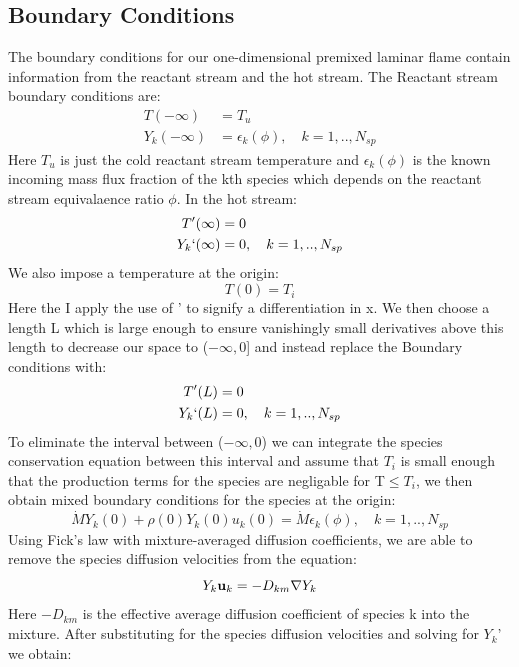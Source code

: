 \documentclass{article}
\begin{document}
\subsection{Boundary Conditions}
The boundary conditions for our one-dimensional premixed laminar flame contain information from the reactant stream and the hot stream. The Reactant stream boundary conditions are:
\begin{align}
  T(-\infty) &= T_{u} \\
  Y_{k}(-\infty) &= \epsilon_{k}({\phi}), \quad k=1,..,N_{sp}
  \end{align}
Here $T_{u}$ is just the cold reactant stream temperature and $\epsilon_{k}(\phi)$ is the known incoming mass flux fraction of the kth species which depends on the reactant stream equivalaence ratio $\phi$. In the hot stream:
\begin{align}
  T'(\infty) & = 0\\
  Y_{k}`(\infty) &= 0,\quad k=1,..,N_{sp}
\end{align}
We also impose a temperature at the origin:
\begin{equation}
  T(0) = T_{i}
\end{equation}
Here the I apply the use of ' to signify a differentiation in x. We then choose a length L which is large enough to ensure vanishingly small derivatives above this length to decrease our space to ($-\infty,0$] and instead replace the Boundary conditions with:
\begin{align}
  T'(L) & = 0\\
  Y_{k}`(L) &= 0, \quad k=1,..,N_{sp}
\end{align}
To eliminate the interval between ($-\infty,0$) we can integrate the species conservation equation between this interval and assume that $T_{i}$ is small enough that the production terms for the species are negligable for T$\leq T_{i}$, we then obtain mixed boundary conditions for the species at the origin:
  \begin{equation}
\dot{M}Y_{k}(0) +\rho(0)Y_{k}(0)u_{k}(0) = \dot{M}\epsilon_{k}(\phi), \quad k=1,..,N_{sp}
  \end{equation}
  Using Fick's law with mixture-averaged diffusion coefficients, we are able to remove the species diffusion velocities from the equation:
  \begin{equation}
    Y_{k}\textbf{u}_{k} = -D_{km}\nabla Y_{k}\\
  \end{equation}
  Here $-D_{km}$ is the effective average diffusion coefficient of species k into the mixture. After substituting for the species diffusion velocities and solving for $Y_{k}$' we obtain:
\end{document}
